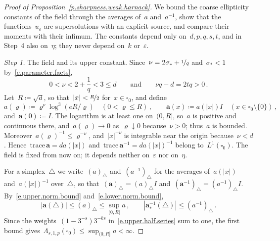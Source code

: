 \documentclass[11pt,letterpaper]{article}
\numberwithin{equation}{section}
\theoremstyle{definition}
\renewcommand{\a}{\mathbf{a}}
\newcommand{\eps}{\varepsilon}
\newcommand{\nf}{\nicefrac}
\newcommand{\cu}{\square}
\newcommand*{\tr}{\mathrm{trace\,}}
\begin{document}
\begin{proof}[Proof of Proposition~\ref{p.sharpness.weak.harnack}]
We bound the coarse ellipticity constants of the field through the averages of~$a$ and~$a^{-1}$, show that the functions~$u_\eps$ are supersolutions with an explicit source, and compare their moments with their infimum. The constants depend only on~$d,p,q,s,t$, and in Step~4 also on~$\eta$; they never depend on~$k$ or~$\eps$.

\smallskip
\emph{Step 1.} The field and its upper constant. Since~$\nu=2\sigma_*+\nf1q$ and~$\sigma_*<1$ by~\eqref{e.parameter.facts},
\begin{equation}
	0<\nu<2+\frac1q<3\leq d\qquad\mbox{and}\qquad\nu q-d=2tq>0\,.
	\label{e.sharpness.weak.harnack.exponents}
\end{equation}
Let~$R\coloneqq\sqrt d$, so that~$|x|<\nf R2$ for~$x\in\cu_0$, and define
\begin{equation*}
	a(\varrho)\coloneqq\varrho^\nu\log^3(eR/\varrho)\quad(0<\varrho\leq R)\,,\qquad\a(x)\coloneqq a(|x|)I\quad(x\in\cu_0\setminus\{0\})\,,
\end{equation*}
and~$\a(0)\coloneqq I$. The logarithm is at least one on~$(0,R]$, so~$a$ is positive and continuous there, and~$a(\varrho)\to0$ as~$\varrho\downarrow0$ because~$\nu>0$; thus~$a$ is bounded. Moreover~$a(\varrho)^{-1}\leq\varrho^{-\nu}$, and~$|x|^{-\nu}$ is integrable near the origin because~$\nu<d$. Hence~$\tr\a=da(|x|)$ and~$\tr\a^{-1}=da(|x|)^{-1}$ belong to~$L^1(\cu_0)$. The field is fixed from now on; it depends neither on~$\eps$ nor on~$\eta$.

\smallskip
For a simplex~$\triangle$ we write~$(a)_\triangle$ and~$(a^{-1})_\triangle$ for the averages of~$a(|x|)$ and~$a(|x|)^{-1}$ over~$\triangle$, so that~$(\a)_\triangle=(a)_\triangle I$ and~$(\a^{-1})_\triangle=(a^{-1})_\triangle I$. By~\eqref{e.upper.norm.bound} and~\eqref{e.lower.norm.bound},
\begin{equation}
	|\a(\triangle)|\leq(a)_\triangle\leq\sup_{(0,R]}a\,,\qquad|\a_*^{-1}(\triangle)|\leq(a^{-1})_\triangle\,.
	\label{e.sharpness.weak.harnack.matrices}
\end{equation}
Since the weights~$(1-3^{-s})3^{-ks}$ in~\eqref{e.upper.half.series} sum to one, the first bound gives~$\Lambda_{s,1,p}(\cu_0)\leq\sup_{(0,R]}a<\infty$.


\end{proof}
\end{document}

